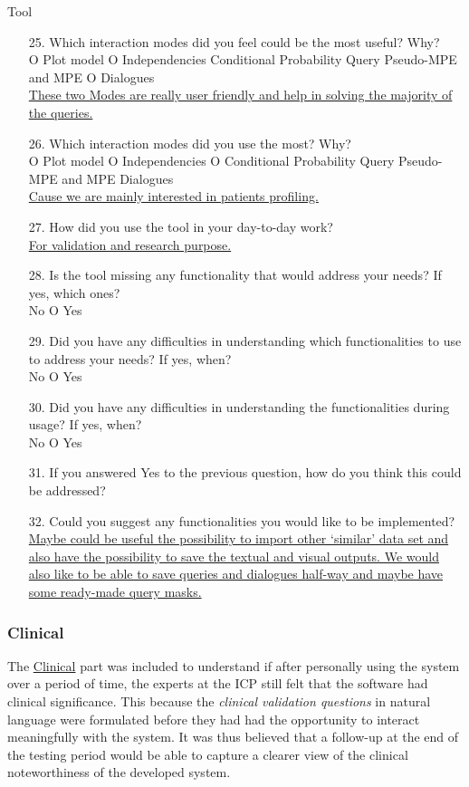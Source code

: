 \begin{framed}
	{\Large Tool}
	\begin{enumerate}[resume]
		\item[25.] Which interaction modes did you feel could be the most useful?  Why? \\
		O Plot model O Independencies  Conditional Probability Query  Pseudo-MPE and MPE O Dialogues\\
		\ul{These two Modes are really user friendly and help in solving the majority of the queries.}
		\item[26.] Which interaction modes did you use the most?  Why? \\
		O Plot model O Independencies O Conditional Probability Query  Pseudo-MPE and MPE  Dialogues\\
		\ul{Cause we are mainly interested in patients profiling.}
		\item[27.] How did you use the tool in your day-to-day work?\\
		\ul{For validation and research purpose.}
		\item[28.] Is the tool missing any functionality that would address your needs?  If yes, which ones? \\
		 No O Yes
		\item[29.] Did you have any difficulties in understanding which functionalities to use to address your needs?  If yes, when? \\
		 No O Yes
		\item[30.] Did you have any difficulties in understanding the functionalities during usage?  If yes, when? \\
		 No O Yes
		\item[31.] If you answered Yes to the previous question, how do you think this could be addressed?
		\item[32.] Could you suggest any functionalities you would like to be implemented?\\
		\ul{Maybe could be useful the possibility to import other `similar' data set and also have the possibility to save the textual and visual outputs.  We would also like to be able to save queries and dialogues half-way and maybe have some ready-made query masks.}
	\end{enumerate}
	\label{ques:tool}
\end{framed}

\subsubsection{Clinical}
The \hyperref[ques:clinical]{Clinical} part was included to understand if after personally using the system over a period of time, the experts at the ICP still felt that the software had clinical significance.
This because the \textit{clinical validation questions} in natural language were formulated before they had had the opportunity to interact meaningfully with the system.
It was thus believed that a follow-up at the end of the testing period would be able to capture a clearer view of the clinical noteworthiness of the developed system.

